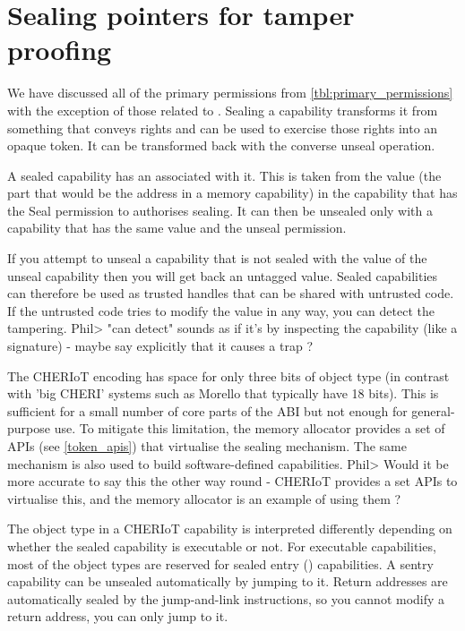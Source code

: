 \section[label=sealing_intro]{Sealing pointers for tamper proofing}

We have discussed all of the primary permissions from \ref{tbl:primary_permissions} with the exception of those related to .
Sealing a capability transforms it from something that conveys rights and can be used to exercise those rights into an opaque token.
It can be transformed back with the converse unseal operation.

A sealed capability has an  associated with it.
This is taken from the value (the part that would be the address in a memory capability) in the capability that has the Seal permission to authorises sealing.
It can then be unsealed only with a capability that has the same value and the unseal permission.

If you attempt to unseal a capability that is not sealed with the value of the unseal capability then you will get back an untagged value.
Sealed capabilities can therefore be used as trusted handles that can be shared with untrusted code.
If the untrusted code tries to modify the value in any way, you can detect the tampering.
Phil> "can detect" sounds as if it's by inspecting the capability (like a signature) - maybe say explicitly that it causes a trap ? 

The CHERIoT encoding has space for only three bits of object type (in contrast with 'big CHERI' systems such as Morello that typically have 18 bits).
This is sufficient for a small number of core parts of the ABI but not enough for general-purpose use.
To mitigate this limitation, the memory allocator provides a set of APIs (see \ref{token_apis}) that virtualise the sealing mechanism.
The same mechanism is also used to build software-defined capabilities.
Phil> Would it be more accurate to say this the other way round - CHERIoT provides a set APIs to virtualise this, and the memory allocator is an example of using them ?

The object type in a CHERIoT capability is interpreted differently depending on whether the sealed capability is executable or not.
For executable capabilities, most of the object types are reserved for sealed entry () capabilities.
A sentry capability can be unsealed automatically by jumping to it.
Return addresses are automatically sealed by the jump-and-link instructions, so you cannot modify a return address, you can only jump to it.

